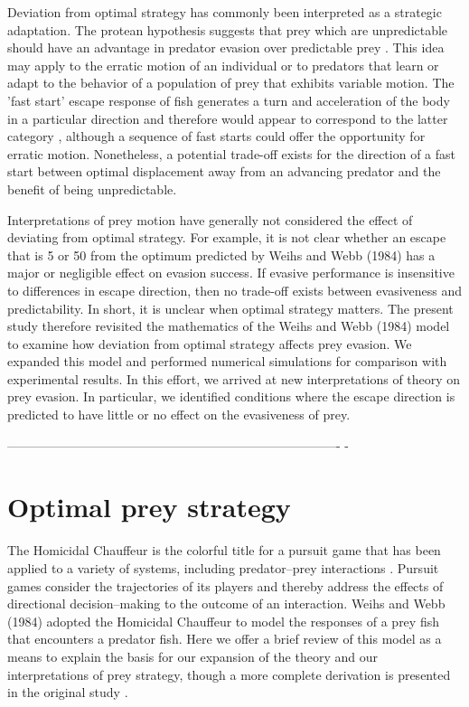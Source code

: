 \documentclass[12pt]{article}
\begin{document}
Deviation from optimal strategy has commonly been interpreted as a strategic
adaptation. The protean hypothesis suggests that prey which are unpredictable
should have an advantage in predator evasion over predictable prey
\citep{Humphries:1970hy}. This idea may apply to the erratic motion of an
individual or to predators that learn or adapt to the behavior of a population
of prey that exhibits variable motion. The 'fast start' escape response of fish
generates a turn and acceleration of the body in a particular direction and
therefore would appear to correspond to the latter category \citep{D:1973up},
although a sequence of fast starts could offer the opportunity for erratic
motion. Nonetheless, a potential trade-off exists for the direction of a fast
start between optimal displacement away from an advancing predator and the
benefit of being unpredictable.  

Interpretations of prey motion have generally not considered the effect of
deviating from optimal strategy. For example, it is not clear whether an escape
that is 5\textdegree\hspace{0.5pt} or 50\textdegree\hspace{0.5pt} from the
optimum predicted by Weihs and Webb (1984) has a major or negligible effect on
evasion success. If evasive performance is insensitive to differences in escape
direction, then no trade-off exists between evasiveness and predictability. In
short, it is unclear when optimal strategy matters. The present study therefore
revisited the mathematics of the Weihs and Webb (1984) model to examine how
deviation from optimal strategy affects prey evasion. We expanded this model
and performed numerical simulations for comparison with experimental results.
In this effort, we arrived at new interpretations of theory on prey evasion. In
particular, we identified conditions where the escape direction is predicted to
have little or no effect on the evasiveness of prey.

%
-------------------------------------------------------------------------------
-
\section{Optimal prey strategy}
\label{opt_strategy}

The Homicidal Chauffeur is the colorful title for a pursuit game that has been
applied to a variety of systems, including predator--prey interactions
\citep{Isaacs:1965va}. Pursuit games consider the trajectories of its players
and thereby address the effects of directional decision--making to the outcome
of an interaction. Weihs and Webb (1984) adopted the Homicidal Chauffeur to
model the responses of a prey fish that encounters a predator fish. Here we
offer a brief review of this model as a means to explain the basis for our
expansion of the theory and our interpretations of prey strategy, though a more
complete derivation is presented in the original study
\citep{Weihs:1984tb}.
\end{document}
